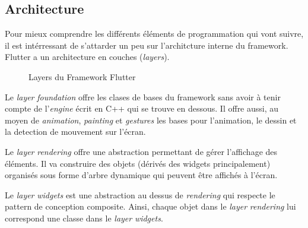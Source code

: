     \subsection{Architecture}
    Pour mieux comprendre les différents éléments de programmation qui vont suivre, il est intérressant de s'attarder
    un peu sur l'architcture interne du framework.  
    Flutter a un architecture en couches (\textit{layers}).
    \begin{figure}[!h]
        \begin{center}
        \end{center}
        \caption{Layers du Framework Flutter}
        \label{fig:layers}
    \end{figure}

    Le \textit{layer} \textit{foundation} offre les clases de bases du framework sans avoir à tenir compte
    de l'\textit{engine} écrit en C++ qui se trouve en dessous. Il offre aussi, au moyen de \textit{animation}, \textit{painting}
    et \textit{gestures} les bases pour l'animation, le dessin et la detection de mouvement sur l'écran.

    Le \textit{layer} \textit{rendering} offre une abstraction permettant de gérer l'affichage des éléments.
    Il va construire des objets (dérivés des widgets principalement) organisés sous forme d'arbre dynamique qui peuvent être affichés à l'écran.

    Le \textit{layer} \textit{widgets} est une abstraction au dessus de \textit{rendering} qui respecte le pattern de conception composite. Ainsi, chaque objet dans le \textit{layer} \textit{rendering} 
    lui correspond une classe dans le \textit{layer} \textit{widgets}.

